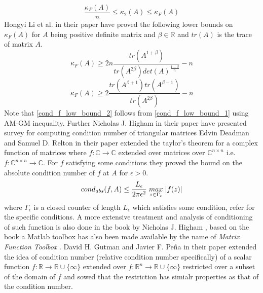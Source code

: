 \begin{equation} \label{cond_2_rel_cond_forb}
    \frac{\kappa_F(A)}{n} \le \kappa_2(A) \le \kappa_F(A)
\end{equation}
Hongyi Li et al. in their paper \cite{li2011note} have proved the following lower bounds on $\kappa_F(A)$ for $A$ being positive definite matrix and $\beta \in \mathbb{R}$ and $tr(A)$ is the trace of matrix $A$.
\begin{equation} \label{cond_f_low_bound_1}
    \kappa_F(A) \ge 2n\frac{tr(A^{1+\beta})}{tr(A^{2\beta})det(A)^{\frac{1-\beta}{n}}} -n
\end{equation}
\begin{equation} \label{cond_f_low_bound_2}
    \kappa_F(A) \ge 2\frac{tr(A^{\beta+1})tr(A^{\beta-1})}{tr(A^{2\beta})} -n
\end{equation}
Note that \ref{cond_f_low_bound_2} follows from \ref{cond_f_low_bound_1} using AM-GM inequality. Further Nicholas J. Higham in their paper \cite{higham1987survey} have presented survey for computing condition number of triangular matrices
\newpage
{}
Edvin Deadman and Samuel D. Relton in their paper \cite{deadman2016taylor} extended the taylor's theorem for a complex function of matrices where $f:\mathbb{C}\to \mathbb{C}$ extended over matrices over $\mathbb{C}^{n\times n}$ i.e. $f:\mathbb{C}^{n\times n}\to \mathbb{C}$. For $f$ satisfying some conditions they proved the bound on the absolute condition number of $f$ at $A$ for $\epsilon>0$.
\begin{equation}
    cond_{abs}(f,A) \le \frac{L_{\epsilon}}{2\pi\epsilon^2}\hspace{1mm}\underset{z\in \Gamma_{\epsilon}}{max}\hspace{1mm} |f(z)|
\end{equation}
where $\Gamma_{\epsilon}$ is a closed counter of length $L_{\epsilon}$ which satisfies some condition, refer \cite{deadman2016taylor} for the specific conditions. A more extensive treatment and analysis of conditioning of such function is also done in the book by Nicholas J. Higham \cite{higham2008functions}, based on the book a Matlab toolbox has also been made available by the name of \textit{Matrix Function Toolbox} \cite{highammatlabtoolbox}.
\newline \newline David H. Gutman and Javier F. Peña in their paper \cite{gutman2021condition} extended the idea of condition number (relative condition number specifically) of a scalar function $f:\mathbb{R}\to \mathbb{R}\cup \{\infty\}$ extended over $f:\mathbb{R}^n\to \mathbb{R}\cup \{\infty\}$  restricted over a subset of the domain of $f$ and sowed that the restriction has simialr properties as that of the condition number.